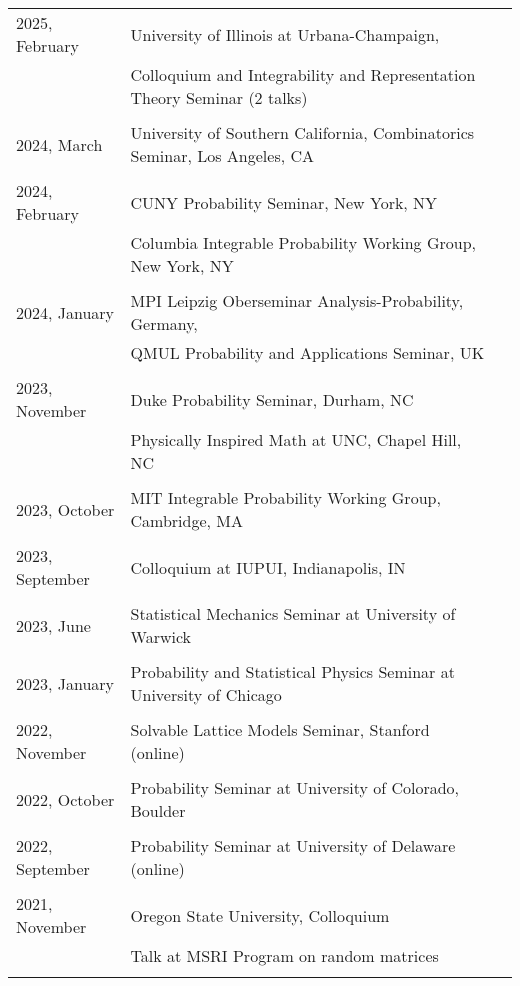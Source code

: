 \documentclass[letterpaper,11pt]{article}
\begin{document}
\begin{longtable}{llc}
    2025, February
    & University of Illinois at Urbana-Champaign,
    \\
    &
    Colloquium and Integrability and Representation Theory Seminar (2 talks)
    \\\\
    2024, March
    & University of Southern California,
    Combinatorics Seminar, Los Angeles, CA
    \\\\
	2024, February
	& CUNY Probability Seminar, New York, NY
	\\
	& Columbia Integrable Probability Working Group, New York, NY
	\\\\
	2024, January
	& MPI Leipzig Oberseminar Analysis-Probability, Germany,
	\\
	& QMUL Probability and Applications Seminar, UK
	\\\\
	2023, November
	& Duke Probability Seminar, Durham, NC
	\\
	& Physically Inspired Math at UNC, Chapel Hill, NC
	\\\\
	2023, October
	& MIT Integrable Probability Working Group, Cambridge, MA
	\\\\
	2023, September
	& Colloquium at IUPUI, Indianapolis, IN
	\\\\
	2023, June
	& Statistical Mechanics Seminar at University of Warwick
	\\\\
	2023, January
	& Probability and Statistical Physics Seminar at University of Chicago
	\\\\
	2022, November
	& Solvable Lattice Models Seminar, Stanford (online)
	\\\\
	2022, October
	& Probability Seminar at University of Colorado, Boulder
	\\\\
	2022, September
	& Probability Seminar at University of Delaware (online)
	\\\\
	2021, November
	& Oregon State University, Colloquium
	\\
	& Talk at MSRI Program on random matrices
	\\\\

\end{longtable}
\end{document}
